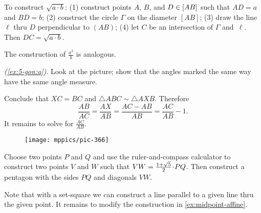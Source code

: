 \setcounter{eqtn}{0}

%
%
%
%

To construct  $\sqrt{a\cdot b}$:
(1) construct points $A$, $B$, and $D\in [AB]$
such that $AD=a$ and $BD=b$;
(2) construct the circle $\Gamma$ on the diameter $[AB]$;
(3) draw the line $\ell$ thru $D$ perpendicular to $(AB)$; 
(4) let $C$ be an intersection of $\Gamma$ and~$\ell$.
Then $DC= \sqrt{a\cdot b}$.


The construction of $\tfrac{a^2}b$ is analogous.

\parbf{\ref{ex:5-gon},} \textit{(\ref{ex:5-gon:a})}.
Look at the picture;
show that the angles marked the same way have the same angle measure.

Conclude that $XC=BC$ and $\triangle ABC\sim \triangle AXB$.
Therefore 
\[\frac{AB}{AC}=\frac{AX}{AB}=\frac{AC-AB}{AB}=\frac{AC}{AB}-1.\]
It remains to solve for $\frac{AC}{AB}$.

{

\begin{wrapfigure}[7]{r}{27mm}
\vskip-8mm
\centering
\texttt{[image: mppics/pic-366]}
\end{wrapfigure}

Choose two points $P$ and $Q$ and use the ruler-and-compass calculator to construct two points $V$ and $W$ such that $VW\z=\tfrac{1+\sqrt5}2\cdot PQ$.
Then construct a pentagon with the sides $PQ$ and diagonals $VW$.

}

Note that with a set-square we can construct a line parallel to a given line thru the given point.
It remains to modify the construction in \ref{ex:midpoint-affine}.

